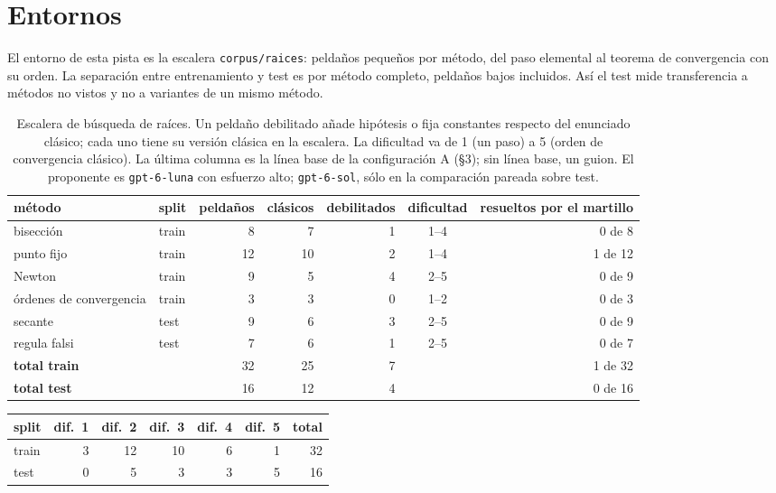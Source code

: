 \documentclass[11pt,a4paper]{article}
\begin{document}
\section{Entornos}

El entorno de esta pista es la escalera \texttt{corpus/raices}: peldaños pequeños por método, del paso elemental al teorema de convergencia con su orden. La separación entre entrenamiento y test es por método completo, peldaños bajos incluidos. Así el test mide transferencia a métodos no vistos y no a variantes de un mismo método.

\begin{table}[h]
\centering
\footnotesize
\begin{tabular}{@{}llrrrcr@{}}
\toprule
método & split & peldaños & clásicos & debilitados & dificultad & resueltos por el martillo \\
\midrule
bisección & train & 8 & 7 & 1 & 1--4 & 0 de 8 \\
punto fijo & train & 12 & 10 & 2 & 1--4 & 1 de 12 \\
Newton & train & 9 & 5 & 4 & 2--5 & 0 de 9 \\
órdenes de convergencia & train & 3 & 3 & 0 & 1--2 & 0 de 3 \\
secante & test & 9 & 6 & 3 & 2--5 & 0 de 9 \\
regula falsi & test & 7 & 6 & 1 & 2--5 & 0 de 7 \\
\midrule
\textbf{total train} & & 32 & 25 & 7 & & 1 de 32 \\
\textbf{total test} & & 16 & 12 & 4 & & 0 de 16 \\
\bottomrule
\end{tabular}
\caption{Escalera de búsqueda de raíces. Un peldaño debilitado añade hipótesis o fija constantes respecto del enunciado clásico; cada uno tiene su versión clásica en la escalera. La dificultad va de 1 (un paso) a 5 (orden de convergencia clásico). La última columna es la línea base de la configuración A (§3); sin línea base, un guion. El proponente es \texttt{gpt-6-luna} con esfuerzo alto; \texttt{gpt-6-sol}, sólo en la comparación pareada sobre test.}
\label{tab:envs}
\end{table}

\begin{center}
\footnotesize
\begin{tabular}{@{}lrrrrrr@{}}
\toprule
split & dif.~1 & dif.~2 & dif.~3 & dif.~4 & dif.~5 & total \\
\midrule
train & 3 & 12 & 10 & 6 & 1 & 32 \\
test & 0 & 5 & 3 & 3 & 5 & 16 \\
\bottomrule
\end{tabular}
\end{center}
\end{document}
